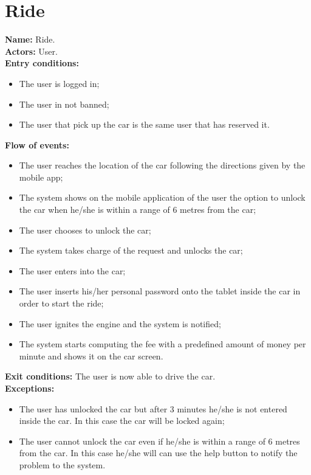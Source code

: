 \section*{Ride}
\textbf{Name:} Ride.\\
\textbf{Actors:} User.\\
\textbf{Entry conditions:}
\begin{itemize}
\item The user is logged in;
\item The user in not banned;
\item The user that pick up the car is the same user that has reserved it.
\end{itemize}
\textbf{Flow of events:}
\begin{itemize}
\item The user reaches the location of the car following the directions given by the mobile app;
\item The system shows on the mobile application of the user the option to unlock the car when he/she is within a range of 6 metres from the car;
\item The user chooses to unlock the car;
\item The system takes charge of the request and unlocks the car;
\item The user enters into the car;
\item The user inserts his/her personal password onto the tablet inside the car in order to start the ride;
\item The user ignites the engine and the system is notified;
\item The system starts computing the fee with a predefined amount of money per minute and shows it on the car screen.
\end{itemize}
\textbf{Exit conditions:} The user is now able to drive the car.\\
\textbf{Exceptions:}
\begin{itemize}
\item The user has unlocked the car but after 3 minutes he/she is not entered inside the car. In this case the car will be locked again;
\item The user cannot unlock the car even if he/she is within a range of 6 metres from the car. In this case he/she will can use the help button to notify the problem to the system.
\end{itemize}



